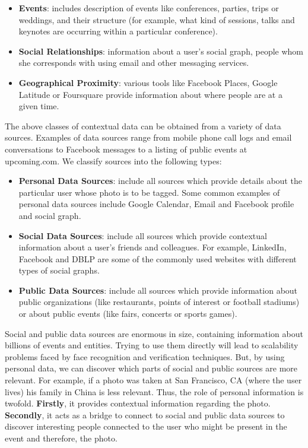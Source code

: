 \begin{itemize}
\item \textbf{Events}: includes description of events like conferences, parties, trips or weddings, and their structure (for example, what kind of sessions, talks and keynotes are occurring within a particular conference).
\item \textbf{Social Relationships}: information about a user's social graph, people whom she corresponds with using email and other messaging services.
\item \textbf{Geographical Proximity}: various tools like Facebook Places, Google Latitude or Foursquare provide information about where people are at a given time.
\end{itemize}

The above classes of contextual data can be obtained from a variety of data sources. Examples of data sources range from mobile phone call logs and email conversations to Facebook messages to a listing of public events at upcoming.com. We classify sources into the following types:

\begin{itemize}
\item \textbf{Personal Data Sources}: include all sources which provide details about the particular user whose photo is to be tagged. Some common examples of personal data sources include Google Calendar, Email and Facebook profile and social graph.
\item \textbf{Social Data Sources}: include all sources which provide contextual information about a user's friends and colleagues. For example, LinkedIn, Facebook and DBLP are some of the commonly used websites with different types of social graphs.
\item \textbf{Public Data Sources}: include all sources which provide information about public organizations (like restaurants, points of interest or football stadiums) or about public events (like fairs, concerts or sports games).
\end{itemize}

Social and public data sources are enormous in size, containing information about billions of events and entities. Trying to use them directly will lead to scalability problems faced by face recognition and verification techniques. But, by using personal data, we can discover which parts of social and public sources are more relevant. For example, if a photo was taken at San Francisco, CA (where the user lives) his family in China is less relevant. Thus, the role of personal information is twofold. \textbf{Firstly}, it provides contextual information regarding the photo. \textbf{Secondly}, it acts as a bridge to connect to social and public data sources to discover interesting people connected to the user who might be present in the event and therefore, the photo.


